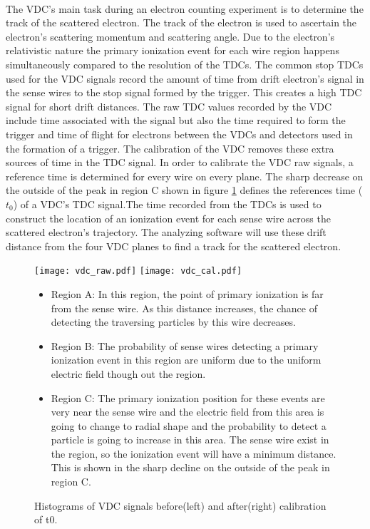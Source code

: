 	\paragraph{}The VDC's main task during an electron counting experiment is to determine the track of the scattered electron. The track of the electron is used to ascertain the electron's scattering momentum and scattering angle. Due to the electron's relativistic nature the primary ionization event for each wire region happens simultaneously compared to the resolution of the TDCs. The common stop TDCs used for the VDC signals record the amount of time from drift electron's signal in the sense wires to the stop signal formed by the trigger. This creates a high TDC signal for short drift distances. The raw TDC values recorded by the VDC include time associated with the signal but also the time required to form the trigger and time of flight for electrons between the VDCs and detectors used in the formation of a trigger. The calibration of the VDC removes these extra sources of time in the TDC signal. In order to calibrate the VDC raw signals, a reference time is determined for every wire on every plane. The sharp decrease on the outside of the peak in region C shown in figure \ref{fig:vdcraw} defines the references time ($t_0$) of a VDC's TDC signal.The time recorded from the TDCs is used to construct the location of an ionization event for each sense wire across the scattered electron's trajectory. The analyzing software will use these drift distance from the four VDC planes to find a track for the scattered electron.
	\begin{figure}[H]
		\centering
		\texttt{[image: vdc\_raw.pdf]}
		\texttt{[image: vdc\_cal.pdf]}
		\caption{Histograms of VDC signals before(left) and after(right) calibration of t0\cite{primer}.}
		\label{fig:vdcraw}
	\begin{itemize}
		\item Region A: In this region, the point of primary ionization is far from the sense wire. As this distance increases, the chance of detecting the traversing particles by this wire decreases. 
		\item Region B: The probability of sense wires detecting a primary ionization event in this region are uniform due to the uniform electric field though out the region. 
		\item Region C: The primary ionization position for these events are very near the sense wire and the electric field from this area is going to change to radial shape and the 	probability to detect a particle is going to increase in this area. The sense wire exist in the region, so the ionization event will have a minimum distance. This is shown in the sharp decline on the outside of the peak in region C. 
		\cite{primer}
	\end{itemize}	
	\end{figure}


